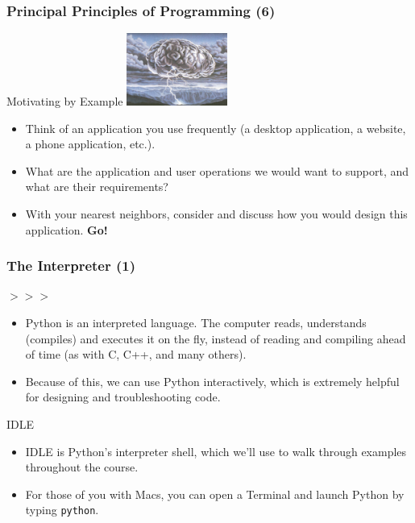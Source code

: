 \documentclass[10pt]{beamer}
\begin{document}
\begin{frame}
  \frametitle{Principal Principles of Programming (6)}
  \begin{block}{Motivating by Example}
    \centering
    \vspace{10px}
    \includegraphics[width=125px]{Brainstorm.jpg}
    \vspace{5px}
    \begin{itemize}
      \item Think of an application you use frequently (a desktop application, a website, a phone application, etc.).
      \item What are the application and user operations we would want to support, and what are their requirements?
      \item With your nearest neighbors, consider and discuss how you would design this application.
        \textbf{Go!}
    \end{itemize}
  \end{block}
\end{frame}

\begin{frame}
  \frametitle{The Interpreter (1)}
  \begin{block}{$>>>$}
    \begin{itemize}
      \item Python is an interpreted language.
        The computer reads, understands (compiles) and executes it on the fly, instead of reading and compiling ahead of time (as with C, C++, and many others).
      \item Because of this, we can use Python interactively, which is extremely helpful for designing and troubleshooting code.
    \end{itemize}
  \end{block}
  \begin{block}{IDLE}
    \begin{itemize}
      \item IDLE is Python's interpreter shell, which we'll use to walk through examples throughout the course.
      \item For those of you with Macs, you can open a Terminal and launch Python by typing \texttt{python}.
    \end{itemize}
  \end{block}
\end{frame}
\end{document}
